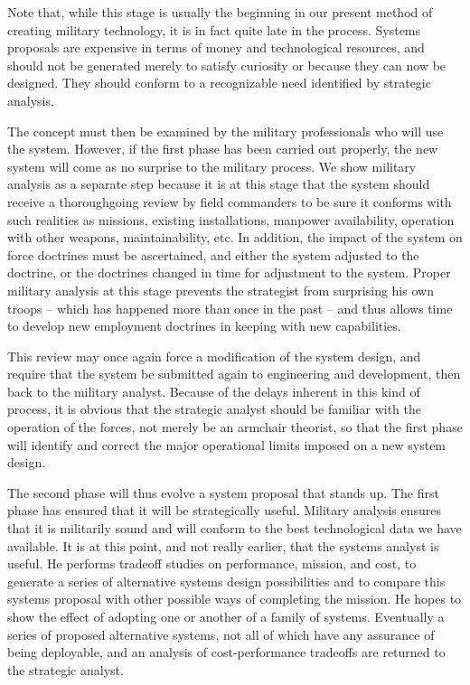 Note that, while this stage is usually the beginning in our present method of creating military technology, it is in fact quite late in the process. Systems proposals are expensive in terms of money and technological resources, and should not be generated merely to satisfy curiosity or because they can now be designed. They should conform to a recognizable need identified by strategic analysis.

The concept must then be examined by the military professionals who will use the system. However, if the first phase has been carried out properly, the new system will come as no surprise to the military process. We show military analysis as a separate step because it is at this stage that the system should receive a thoroughgoing review by field commanders to be sure it conforms with such realities as missions, existing installations, manpower availability, operation with other weapons, maintainability, etc. In addition, the impact of the system on force doctrines must be ascertained, and either the system adjusted to the doctrine, or the doctrines changed in time for adjustment to the system. Proper military analysis at this stage prevents the strategist from surprising his own troops -- which has happened more than once in the past -- and thus allows time to develop new employment doctrines in keeping with new capabilities.

This review may once again force a modification of the system design, and require that the system be submitted again to engineering and development, then back to the military analyst. Because of the delays inherent in this kind of process, it is obvious that the strategic analyst should be familiar with the operation of the forces, not merely be an armchair theorist, so that the first phase will identify and correct the major operational limits imposed on a new system design.

The second phase will thus evolve a system proposal that stands up. The first phase has ensured that it will be strategically useful. Military analysis ensures that it is militarily sound and will conform to the best technological data we have available. It is at this point, and not really earlier, that the systems analyst is useful. He performs tradeoff studies on performance, mission, and cost, to generate a series of alternative systems design possibilities and to compare this systems proposal with other possible ways of completing the mission. He hopes to show the effect of adopting one or another of a family of systems. Eventually a series of proposed alternative systems, not all of which have any assurance of being deployable, and an analysis of cost-performance tradeoffs are returned to the strategic analyst.


